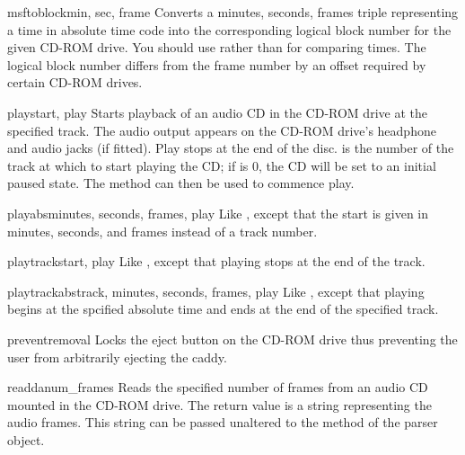 \begin{methoddesc}[CD player]{msftoblock}{min, sec, frame}
Converts a minutes, seconds, frames triple representing a time in
absolute time code into the corresponding logical block number for the
given CD-ROM drive.  You should use  rather than
 for comparing times.  The logical block number
differs from the frame number by an offset required by certain CD-ROM
drives.
\end{methoddesc}

\begin{methoddesc}[CD player]{play}{start, play}
Starts playback of an audio CD in the CD-ROM drive at the specified
track.  The audio output appears on the CD-ROM drive's headphone and
audio jacks (if fitted).  Play stops at the end of the disc.
 is the number of the track at which to start playing the
CD; if  is 0, the CD will be set to an initial paused
state.  The method  can then be used to commence
play.
\end{methoddesc}

\begin{methoddesc}[CD player]{playabs}{minutes, seconds, frames, play}
Like , except that the start is given in minutes,
seconds, and frames instead of a track number.
\end{methoddesc}

\begin{methoddesc}[CD player]{playtrack}{start, play}
Like , except that playing stops at the end of the
track.
\end{methoddesc}

\begin{methoddesc}[CD player]{playtrackabs}{track, minutes, seconds, frames, play}
Like , except that playing begins at the spcified
absolute time and ends at the end of the specified track.
\end{methoddesc}

\begin{methoddesc}[CD player]{preventremoval}{}
Locks the eject button on the CD-ROM drive thus preventing the user
from arbitrarily ejecting the caddy.
\end{methoddesc}

\begin{methoddesc}[CD player]{readda}{num_frames}
Reads the specified number of frames from an audio CD mounted in the
CD-ROM drive.  The return value is a string representing the audio
frames.  This string can be passed unaltered to the
 method of the parser object.
\end{methoddesc}

